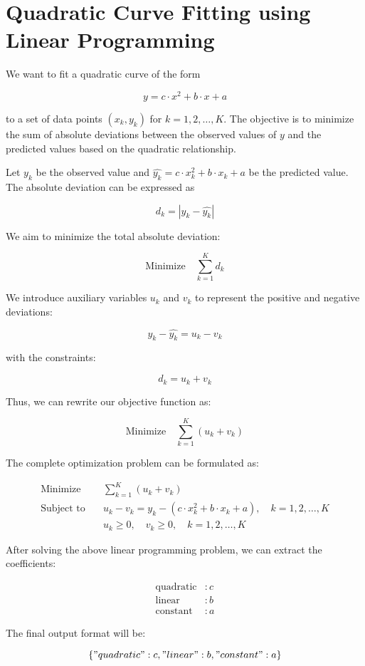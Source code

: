 \documentclass{article}
\begin{document}
\section*{Quadratic Curve Fitting using Linear Programming}

We want to fit a quadratic curve of the form 

\[
y = c \cdot x^2 + b \cdot x + a
\]

to a set of data points \((x_k, y_k)\) for \(k = 1, 2, \ldots, K\). The objective is to minimize the sum of absolute deviations between the observed values of \(y\) and the predicted values based on the quadratic relationship.

Let \(y_k\) be the observed value and \(\hat{y_k} = c \cdot x_k^2 + b \cdot x_k + a\) be the predicted value. The absolute deviation can be expressed as 

\[
d_k = |y_k - \hat{y_k}|
\]

We aim to minimize the total absolute deviation:

\[
\text{Minimize} \quad \sum_{k=1}^{K} d_k
\]

We introduce auxiliary variables \(u_k\) and \(v_k\) to represent the positive and negative deviations:

\[
y_k - \hat{y_k} = u_k - v_k
\]

with the constraints:

\[
d_k = u_k + v_k
\]

Thus, we can rewrite our objective function as:

\[
\text{Minimize} \quad \sum_{k=1}^{K} (u_k + v_k)
\]

The complete optimization problem can be formulated as:

\[
\begin{align*}
\text{Minimize} \quad & \sum_{k=1}^{K} (u_k + v_k) \\
\text{Subject to} \quad & u_k - v_k = y_k - (c \cdot x_k^2 + b \cdot x_k + a), \quad k = 1, 2, \ldots, K \\
& u_k \geq 0, \quad v_k \geq 0, \quad k = 1, 2, \ldots, K
\end{align*}
\]

After solving the above linear programming problem, we can extract the coefficients:

\[
\begin{align*}
\text{quadratic} & : c \\
\text{linear} & : b \\
\text{constant} & : a
\end{align*}
\]

The final output format will be:

\[
\{
    "quadratic": c,
    "linear": b,
    "constant": a
\}
\]
\end{document}
